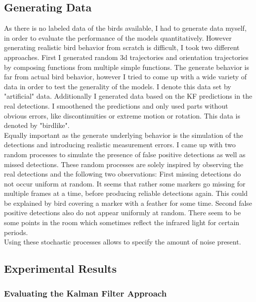 \documentclass{article}
\begin{document}
\subsection{Generating Data}
As there is no labeled data of the birds available, I had to generate data myself, in order to evaluate the performance of the models quantitatively. However generating realistic bird behavior from scratch is difficult, I took two different approaches. First I generated random 3d trajectories and orientation trajectories by composing functions from multiple simple functions. The generate behavior is far from actual bird behavior, however I tried to come up with a wide variety of data in order to test the generality of the models. I denote this data set by "artificial" data. Additionally I generated data based on the KF predictions in the real detections. I smoothened the predictions and only used parts without obvious errors, like discontinuities or extreme motion or rotation. This data is denoted by "birdlike".\\
Equally important as the generate underlying behavior is the simulation of the detections and introducing realistic measurement errors. I came up with two random processes to simulate the presence of false positive detections as well as missed detections. These random processes are solely inspired by observing the real detections and the following two observations: First missing detections do not occur uniform at random. It seems that rather some markers go missing for multiple frames at a time, before producing reliable detections again. This could be explained by bird covering a marker with a feather for some time. Second false positive detections also do not appear uniformly at random. There seem to be some points in the room which sometimes reflect the infrared light for certain periods.\\
Using these stochastic processes allows to specify the amount of noise present.

\subsection{Experimental Results}
\subsubsection{Evaluating the Kalman Filter Approach}
\label{results_kalman_filter}
\end{document}
